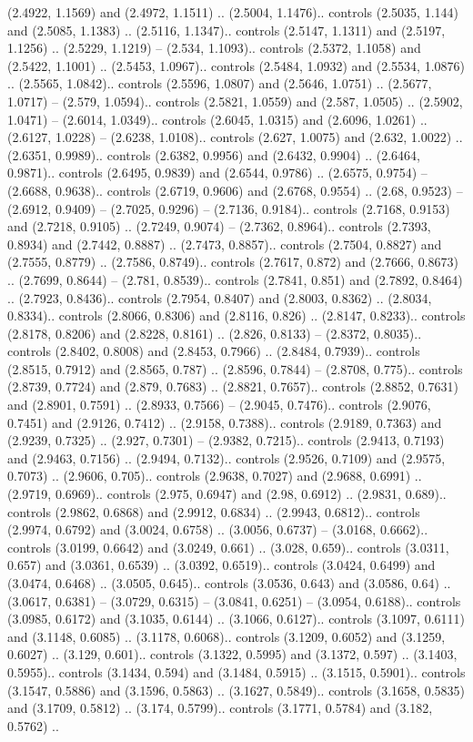 (2.4922, 1.1569) and (2.4972, 1.1511) .. (2.5004, 1.1476).. controls (2.5035, 1.144) and (2.5085, 1.1383) .. (2.5116, 1.1347).. controls (2.5147, 1.1311) and (2.5197, 1.1256) .. (2.5229, 1.1219) -- (2.534, 1.1093).. controls (2.5372, 1.1058) and (2.5422, 1.1001) .. (2.5453, 1.0967).. controls (2.5484, 1.0932) and (2.5534, 1.0876) .. (2.5565, 1.0842).. controls (2.5596, 1.0807) and (2.5646, 1.0751) .. (2.5677, 1.0717) -- (2.579, 1.0594).. controls (2.5821, 1.0559) and (2.587, 1.0505) .. (2.5902, 1.0471) -- (2.6014, 1.0349).. controls (2.6045, 1.0315) and (2.6096, 1.0261) .. (2.6127, 1.0228) -- (2.6238, 1.0108).. controls (2.627, 1.0075) and (2.632, 1.0022) .. (2.6351, 0.9989).. controls (2.6382, 0.9956) and (2.6432, 0.9904) .. (2.6464, 0.9871).. controls (2.6495, 0.9839) and (2.6544, 0.9786) .. (2.6575, 0.9754) -- (2.6688, 0.9638).. controls (2.6719, 0.9606) and (2.6768, 0.9554) .. (2.68, 0.9523) -- (2.6912, 0.9409) -- (2.7025, 0.9296) -- (2.7136, 0.9184).. controls (2.7168, 0.9153) and (2.7218, 0.9105) .. (2.7249, 0.9074) -- (2.7362, 0.8964).. controls (2.7393, 0.8934) and (2.7442, 0.8887) .. (2.7473, 0.8857).. controls (2.7504, 0.8827) and (2.7555, 0.8779) .. (2.7586, 0.8749).. controls (2.7617, 0.872) and (2.7666, 0.8673) .. (2.7699, 0.8644) -- (2.781, 0.8539).. controls (2.7841, 0.851) and (2.7892, 0.8464) .. (2.7923, 0.8436).. controls (2.7954, 0.8407) and (2.8003, 0.8362) .. (2.8034, 0.8334).. controls (2.8066, 0.8306) and (2.8116, 0.826) .. (2.8147, 0.8233).. controls (2.8178, 0.8206) and (2.8228, 0.8161) .. (2.826, 0.8133) -- (2.8372, 0.8035).. controls (2.8402, 0.8008) and (2.8453, 0.7966) .. (2.8484, 0.7939).. controls (2.8515, 0.7912) and (2.8565, 0.787) .. (2.8596, 0.7844) -- (2.8708, 0.775).. controls (2.8739, 0.7724) and (2.879, 0.7683) .. (2.8821, 0.7657).. controls (2.8852, 0.7631) and (2.8901, 0.7591) .. (2.8933, 0.7566) -- (2.9045, 0.7476).. controls (2.9076, 0.7451) and (2.9126, 0.7412) .. (2.9158, 0.7388).. controls (2.9189, 0.7363) and (2.9239, 0.7325) .. (2.927, 0.7301) -- (2.9382, 0.7215).. controls (2.9413, 0.7193) and (2.9463, 0.7156) .. (2.9494, 0.7132).. controls (2.9526, 0.7109) and (2.9575, 0.7073) .. (2.9606, 0.705).. controls (2.9638, 0.7027) and (2.9688, 0.6991) .. (2.9719, 0.6969).. controls (2.975, 0.6947) and (2.98, 0.6912) .. (2.9831, 0.689).. controls (2.9862, 0.6868) and (2.9912, 0.6834) .. (2.9943, 0.6812).. controls (2.9974, 0.6792) and (3.0024, 0.6758) .. (3.0056, 0.6737) -- (3.0168, 0.6662).. controls (3.0199, 0.6642) and (3.0249, 0.661) .. (3.028, 0.659).. controls (3.0311, 0.657) and (3.0361, 0.6539) .. (3.0392, 0.6519).. controls (3.0424, 0.6499) and (3.0474, 0.6468) .. (3.0505, 0.645).. controls (3.0536, 0.643) and (3.0586, 0.64) .. (3.0617, 0.6381) -- (3.0729, 0.6315) -- (3.0841, 0.6251) -- (3.0954, 0.6188).. controls (3.0985, 0.6172) and (3.1035, 0.6144) .. (3.1066, 0.6127).. controls (3.1097, 0.6111) and (3.1148, 0.6085) .. (3.1178, 0.6068).. controls (3.1209, 0.6052) and (3.1259, 0.6027) .. (3.129, 0.601).. controls (3.1322, 0.5995) and (3.1372, 0.597) .. (3.1403, 0.5955).. controls (3.1434, 0.594) and (3.1484, 0.5915) .. (3.1515, 0.5901).. controls (3.1547, 0.5886) and (3.1596, 0.5863) .. (3.1627, 0.5849).. controls (3.1658, 0.5835) and (3.1709, 0.5812) .. (3.174, 0.5799).. controls (3.1771, 0.5784) and (3.182, 0.5762) .. 